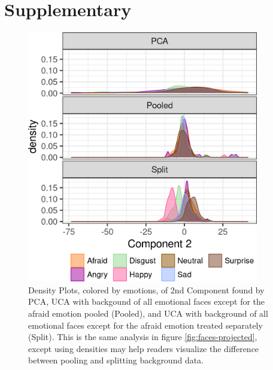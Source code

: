 \documentclass[10pt]{article}
\begin{document}
\section{Supplementary}
\begin{figure}[th!]
  \centering
  \includegraphics[width = 0.9\textwidth]{figure/PC2_density.png}
  \caption{Density Plots, colored by emotions, of 2nd Component found by PCA, UCA with backgound of all emotional faces except for the afraid emotion pooled (Pooled), and UCA with background of all emotional faces except for the afraid emotion treated separately (Split). This is the same analysis in figure \ref{fig:faces-projected}, except using densities may help readers visualize the difference between pooling and splitting background data.}
  \label{fig:FacesDensity}
\end{figure}


\end{document}
